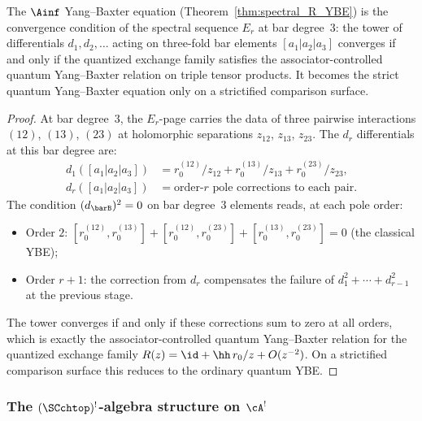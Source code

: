 \begin{corollary}
The $\Ainf$ Yang--Baxter equation
(Theorem~\ref{thm:spectral_R_YBE}) is the convergence condition
of the spectral sequence $E_r$ at bar degree~$3$: the tower of
differentials $d_1, d_2, \ldots$ acting on three-fold bar
elements $[a_1 | a_2 | a_3]$ converges if and only if the quantized
exchange family satisfies the associator-controlled quantum
Yang--Baxter relation on triple tensor products. It becomes the strict
quantum Yang--Baxter equation only on a strictified comparison surface.
\end{corollary}

\begin{proof}
At bar degree~$3$, the $E_r$-page carries the data of three
pairwise interactions $(12)$, $(13)$, $(23)$ at holomorphic
separations $z_{12}$, $z_{13}$, $z_{23}$. The $d_r$
differentials at this bar degree are:
\begin{align*}
d_1([a_1 | a_2 | a_3])
&= r_0^{(12)}/z_{12} + r_0^{(13)}/z_{13}
 + r_0^{(23)}/z_{23}, \\
d_r([a_1 | a_2 | a_3])
&= \text{order-$r$ pole corrections to each pair}.
\end{align*}
The condition $(d_{\barB})^2 = 0$ on bar degree~$3$
elements reads, at each pole order:
\begin{itemize}
\item Order $2$: $[r_0^{(12)}, r_0^{(13)}]
 + [r_0^{(12)}, r_0^{(23)}]
 + [r_0^{(13)}, r_0^{(23)}] = 0$
 \quad (the classical YBE);
\item Order $r+1$: the correction from $d_r$ compensates
 the failure of $d_1^2 + \cdots + d_{r-1}^2$ at the previous
 stage.
\end{itemize}
The tower converges if and only if these corrections sum to zero at all
orders, which is exactly the associator-controlled quantum
Yang--Baxter relation for the quantized exchange family
\(R(z)=\id+\hh\,r_0/z+O(z^{-2})\). On a strictified comparison surface
this reduces to the ordinary quantum YBE.
\end{proof}

\subsubsection*{The $(\SCchtop)^{!}$-algebra structure on $\cA^!$}

